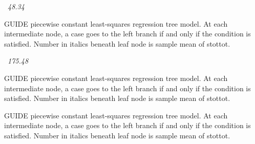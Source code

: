 \documentclass[12pt]{article}
\begin{document}
 \begin{center}
    ~{\textit{48.34}}
 \end{center}
GUIDE piecewise constant least-squares regression tree model.
At each intermediate node, a case goes to the left branch 
  if and only if the condition is satisfied.
Number in italics beneath leaf node is sample mean of stottot.
 \begin{center}
    ~{\textit{175.48}}
 \end{center}
GUIDE piecewise constant least-squares regression tree model.
At each intermediate node, a case goes to the left branch 
  if and only if the condition is satisfied.
Number in italics beneath leaf node is sample mean of stottot.
 \begin{center}
 \end{center}
GUIDE piecewise constant least-squares regression tree model.
At each intermediate node, a case goes to the left branch 
  if and only if the condition is satisfied.
Number in italics beneath leaf node is sample mean of stottot.
\end{document}
